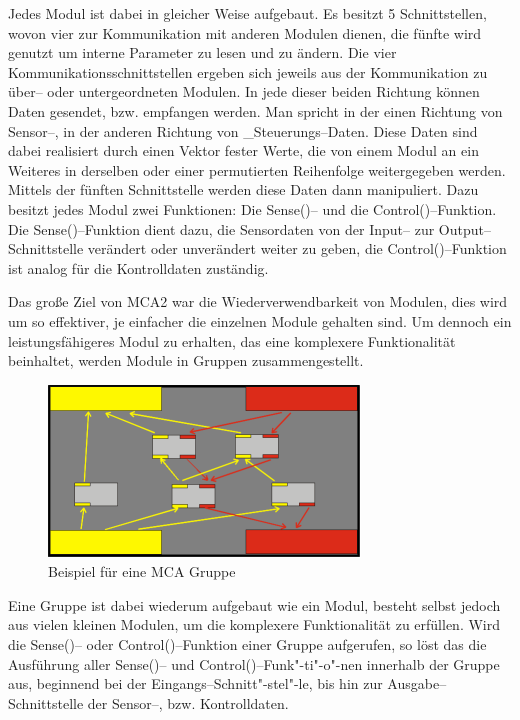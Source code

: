 Jedes Modul ist dabei in gleicher Weise aufgebaut. Es besitzt 5 Schnittstellen, wovon vier zur Kommunikation mit anderen Modulen dienen,
 die fünfte wird genutzt um interne Parameter zu lesen und zu ändern. Die vier Kommunikationsschnittstellen ergeben sich jeweils aus der
 Kommunikation zu über-- oder untergeordneten Modulen. In jede dieser beiden Richtung können Daten gesendet, bzw. empfangen werden.
 Man spricht in der einen Richtung von Sensor--, in der anderen Richtung von _Steuerungs--Daten. Diese Daten sind dabei realisiert durch einen Vektor fester Werte,
 die von einem Modul an ein Weiteres in derselben oder einer permutierten Reihenfolge weitergegeben werden.
 Mittels der fünften Schnittstelle werden diese Daten dann manipuliert. Dazu besitzt jedes Modul zwei Funktionen: Die Sense()-- und die Control()--Funktion.
 Die Sense()--Funktion dient dazu, die Sensordaten von der Input-- zur Output--Schnittstelle verändert oder unverändert weiter zu geben, die Control()--Funktion ist
 analog für die Kontrolldaten zuständig.

Das große Ziel von MCA2 war die Wiederverwendbarkeit von Modulen, dies wird um so effektiver, je einfacher die einzelnen Module gehalten sind.
 Um dennoch ein leistungsfähigeres Modul zu erhalten, das eine komplexere Funktionalität beinhaltet, werden Module in Gruppen zusammengestellt. 

\begin{figure}[h]
	\center
	\includegraphics[scale=2.0]{graphics/mcagroup.png}
	\caption{\label{fig:MCA-Gruppe} Beispiel für eine MCA Gruppe}
\end{figure}

Eine Gruppe ist dabei wiederum aufgebaut wie ein Modul, besteht selbst jedoch aus vielen kleinen Modulen,
 um die komplexere Funktionalität zu erfüllen. Wird die Sense()-- oder Control()--Funktion einer Gruppe aufgerufen,
 so löst das die Ausführung aller Sense()-- und Control()--Funk"-ti"-o"-nen
 innerhalb der Gruppe aus, beginnend bei der Eingangs--Schnitt"-stel"-le, bis hin
 zur Ausgabe--Schnittstelle der Sensor--, bzw. Kontrolldaten.

